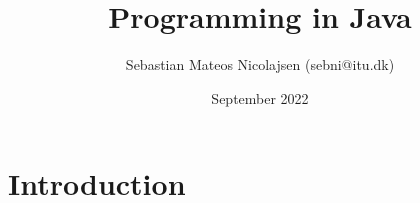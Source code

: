 \documentclass{article}
\title{Programming in Java}
\author{Sebastian Mateos Nicolajsen (sebni@itu.dk) }
\date{September 2022}
\begin{document}
\maketitle

\section{Introduction}
\end{document}
